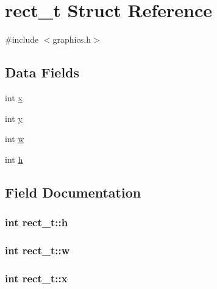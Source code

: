 \hypertarget{structrect__t}{}\section{rect\+\_\+t Struct Reference}
\label{structrect__t}


{\ttfamily \#include $<$graphics.\+h$>$}

\subsection*{Data Fields}
\begin{DoxyCompactItemize}
\item 
int \hyperlink{structrect__t_aac9f3f28f20b5ed45f64fac971269dc3}{x}
\item 
int \hyperlink{structrect__t_a0683ba02d080cdcaeacbf0ab28c73083}{y}
\item 
int \hyperlink{structrect__t_a23768d8ecceecea9f1b8b82edbfed684}{w}
\item 
int \hyperlink{structrect__t_a18f3ee8389363a4a98226d5b9ae117c8}{h}
\end{DoxyCompactItemize}


\subsection{Field Documentation}
\subsubsection[{\texorpdfstring{h}{h}}]{\setlength{\rightskip}{0pt plus 5cm}int rect\+\_\+t\+::h}\hypertarget{structrect__t_a18f3ee8389363a4a98226d5b9ae117c8}{}\label{structrect__t_a18f3ee8389363a4a98226d5b9ae117c8}
\subsubsection[{\texorpdfstring{w}{w}}]{\setlength{\rightskip}{0pt plus 5cm}int rect\+\_\+t\+::w}\hypertarget{structrect__t_a23768d8ecceecea9f1b8b82edbfed684}{}\label{structrect__t_a23768d8ecceecea9f1b8b82edbfed684}
\subsubsection[{\texorpdfstring{x}{x}}]{\setlength{\rightskip}{0pt plus 5cm}int rect\+\_\+t\+::x}\hypertarget{structrect__t_aac9f3f28f20b5ed45f64fac971269dc3}{}\label{structrect__t_aac9f3f28f20b5ed45f64fac971269dc3}
